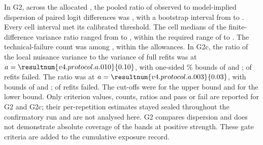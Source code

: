 \par In G2, across the  allocated , the pooled ratio of observed to model-implied dispersion of paired logit differences was , with a bootstrap interval from  to . Every cell interval met its calibrated threshold. The cell medians of the finite-difference variance ratio ranged from  to , within the required range of  to . The technical-failure count was  among  , within the allowances. %
In G2c, the ratio of the local nuisance variance to the variance of full refits was  at $a=\resultnum{v4.protocol.a.010}{0.10}$, with one-sided \% bounds of  and ;  of  refits failed. The ratio was  at $a=\resultnum{v4.protocol.a.003}{0.03}$, with bounds of  and ;  of  refits failed. The cut-offs were  for the upper bound and  for the lower bound. %
Only criterion values, counts, ratios and pass or fail are reported for G2 and G2c; their per-repetition estimates stayed sealed throughout the confirmatory run and are not analysed here. %
G2 compares dispersion and does not demonstrate absolute coverage of the bands at positive strength. %
These gate criteria are added to the cumulative exposure record. %


